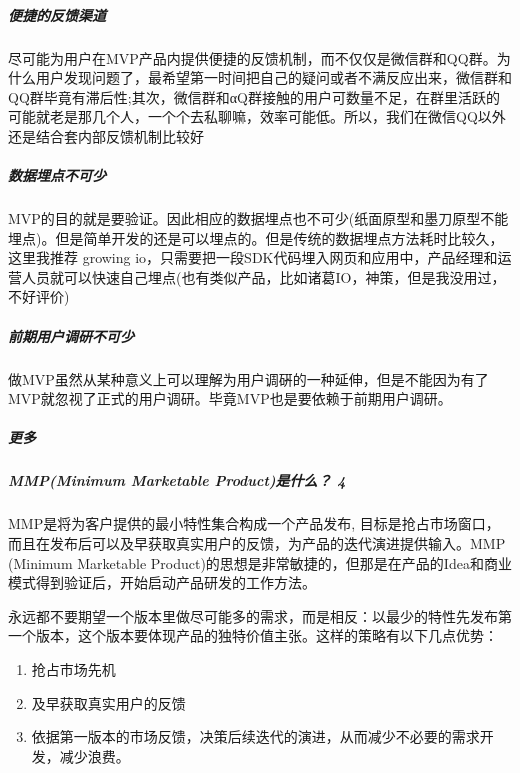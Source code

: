\documentclass[letterpaper,10pt,english]{sphinxmanual}
\begin{document}
\subparagraph{便捷的反馈渠道}
\label{\detokenize{chapter_knowledge/MVP:id4}}
尽可能为用户在MVP产品内提供便捷的反馈机制，而不仅仅是微信群和QQ群。为什么用户发现问题了，最希望第一时间把自己的疑问或者不满反应出来，微信群和QQ群毕竟有滞后性;其次，微信群和αQ群接触的用户可数量不足，在群里活跃的可能就老是那几个人，一个个去私聊嘛，效率可能低。所以，我们在微信QQ以外还是结合套内部反馈机制比较好


\subparagraph{数据埋点不可少}
\label{\detokenize{chapter_knowledge/MVP:id5}}
MVP的目的就是要验证。因此相应的数据埋点也不可少(纸面原型和墨刀原型不能埋点)。但是简单开发的还是可以埋点的。但是传统的数据埋点方法耗时比较久，这里我推荐
growing
io，只需要把一段SDK代码埋入网页和应用中，产品经理和运营人员就可以快速自己埋点(也有类似产品，比如诸葛IO，神策，但是我没用过，不好评价)


\subparagraph{前期用户调研不可少}
\label{\detokenize{chapter_knowledge/MVP:id6}}
做MVP虽然从某种意义上可以理解为用户调硏的一种延伸，但是不能因为有了MVP就忽视了正式的用户调研。毕竟MVP也是要依赖于前期用户调研。


\subparagraph{更多}
\label{\detokenize{chapter_knowledge/MVP:id7}}

\subparagraph{MMP(Minimum Marketable Product)是什么？ 4\sphinxfootnotemark[639]}
\label{\detokenize{chapter_knowledge/MVP:mmp-minimum-marketable-product-4}}%
\begin{footnotetext}[639]\sphinxAtStartFootnote
{}
%
\end{footnotetext}\ignorespaces 
MMP是将为客户提供的最小特性集合构成一个产品发布,
目标是抢占市场窗口，而且在发布后可以及早获取真实用户的反馈，为产品的迭代演进提供输入。MMP
(Minimum Marketable
Product)的思想是非常敏捷的，但那是在产品的Idea和商业模式得到验证后，开始启动产品研发的工作方法。

永远都不要期望一个版本里做尽可能多的需求，而是相反：以最少的特性先发布第一个版本，这个版本要体现产品的独特价值主张。这样的策略有以下几点优势：
\begin{enumerate}
%
\item {} 
抢占市场先机

\item {} 
及早获取真实用户的反馈

\item {} 
依据第一版本的市场反馈，决策后续迭代的演进，从而减少不必要的需求开发，减少浪费。

\end{enumerate}
\end{document}
